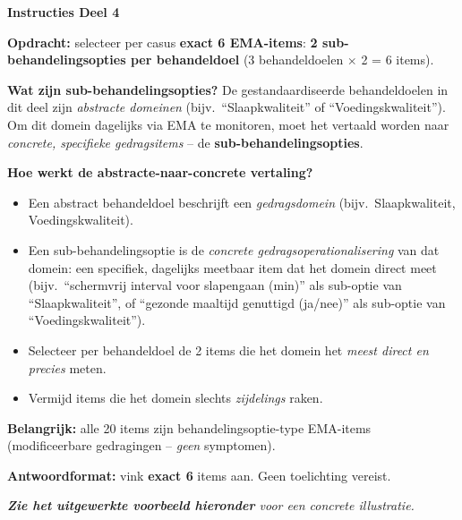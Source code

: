 \documentclass[11pt,a4paper]{article}
\begin{document}
\begin{tcolorbox}[colback=purple!4,colframe=RichPurple,arc=2.5mm,boxrule=0.9pt,
  left=10pt,right=10pt,top=9pt,bottom=9pt]
\textbf{\color{RichPurple}Instructies Deel 4}

\smallskip\small
\textbf{Opdracht:} selecteer per casus \textbf{exact 6 EMA-items}:
\textbf{2 sub-behandelingsopties per behandeldoel} (3 behandeldoelen $\times$ 2 = 6 items).

\textbf{Wat zijn sub-behandelingsopties?}
De gestandaardiseerde behandeldoelen in dit deel zijn \emph{abstracte domeinen}
(bijv.\ ``Slaapkwaliteit'' of ``Voedingskwaliteit'').
Om dit domein dagelijks via EMA te monitoren, moet het vertaald worden naar
\emph{concrete, specifieke gedragsitems} -- de \textbf{sub-behandelingsopties}.

\textbf{Hoe werkt de abstracte-naar-concrete vertaling?}
\begin{itemize}[topsep=2pt,itemsep=1pt]
\item Een abstract behandeldoel beschrijft een \emph{gedragsdomein} (bijv.\ Slaapkwaliteit, Voedingskwaliteit).
\item Een sub-behandelingsoptie is de \emph{concrete gedragsoperationalisering} van dat domein: een specifiek, dagelijks meetbaar item dat het domein direct meet (bijv.\ ``schermvrij interval voor slapengaan (min)'' als sub-optie van ``Slaapkwaliteit'', of ``gezonde maaltijd genuttigd (ja/nee)'' als sub-optie van ``Voedingskwaliteit'').
\item Selecteer per behandeldoel de 2 items die het domein het \emph{meest direct en precies} meten.
\item Vermijd items die het domein slechts \emph{zijdelings} raken.
\end{itemize}

\textbf{Belangrijk:} alle 20 items zijn behandelingsoptie-type EMA-items
(modificeerbare gedragingen -- \emph{geen} symptomen).

\textbf{Antwoordformat:} vink \textbf{exact 6} items aan. Geen toelichting vereist.

\medskip
\textit{\textbf{Zie het uitgewerkte voorbeeld hieronder} voor een concrete illustratie.}
\end{tcolorbox}

\vspace{0.5em}
\nopagebreak[4]
\end{document}
